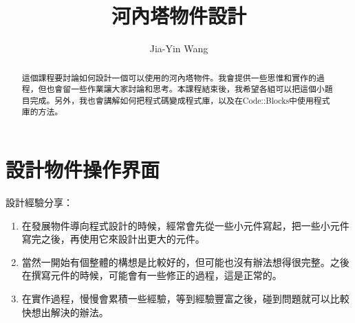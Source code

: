 \documentclass[12pt,a4paper]{article}
\begin{document}
\title{河內塔物件設計}
\author{Jia-Yin Wang}
\maketitle

\begin{abstract}
這個課程要討論如何設計一個可以使用的河內塔物件。我會提供一些思惟和實作的過程，但也會留一些作業讓大家討論和思考。本課程結束後，我希望各組可以把這個小題目完成。另外，我也會講解如何把程式碼變成程式庫，以及在Code::Blocks中使用程式庫的方法。
\end{abstract}
\section{設計物件操作界面}
\noindent 設計經驗分享：

\begin{enumerate}
	\item 在發展物件導向程式設計的時候，經常會先從一些小元件寫起，把一些小元件寫完之後，再使用它來設計出更大的元件。
	\item 當然一開始有個整體的構想是比較好的，但可能也沒有辦法想得很完整。之後在撰寫元件的時候，可能會有一些修正的過程，這是正常的。
	\item 在實作過程，慢慢會累積一些經驗，等到經驗豐富之後，碰到問題就可以比較快想出解決的辦法。
\end{enumerate}
\end{document}
